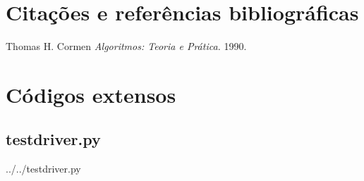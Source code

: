\documentclass[12pt,a4paper,twoside]{report}
\begin{document}
\chapter{Citações e referências bibliográficas}
	\begin{thebibliography}{1}
		
		 Thomas H. Cormen {\em 
			Algoritmos: Teoria e Prática.
		}  1990.
		
	\end{thebibliography}







\clearpage
{}
\appendix

\chapter{Códigos extensos \label{ap:testdriver}}
\section{testdriver.py}
 {../../testdriver.py}
\end{document}
